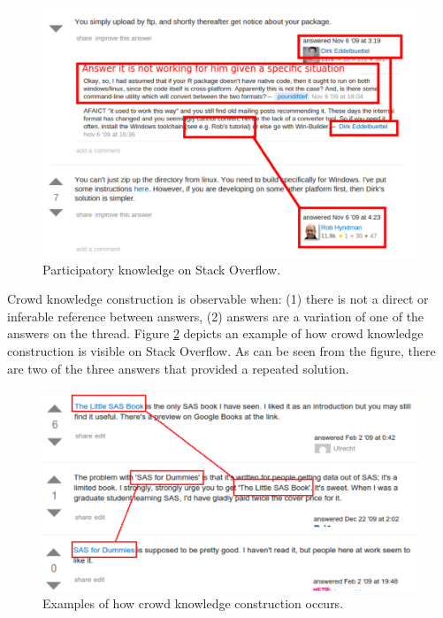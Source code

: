 \documentclass{sig-alternate-05-2015}
\begin{document}
	\begin{figure}[!htb]
		\centering
		\includegraphics[width=\columnwidth]{Figures/SO-PKimg5}
		\caption{Participatory knowledge on Stack Overflow.}
		\label{fig:SO-PK1}
	\end{figure}

	Crowd knowledge construction is observable when:
	(1) there is not a direct or inferable reference between answers, 
	(2) answers are a variation of one of the answers on the thread.
	Figure \ref{fig:CKC_MLSO} depicts an example of how crowd knowledge construction is visible on Stack Overflow.
	As can be seen from the figure, there are two of the three answers that provided a repeated solution.


	\begin{figure} [!htb]
		\centering
		\includegraphics[width=0.9\columnwidth]{Figures/SO-CSimg2}
		\caption{Examples of how crowd knowledge construction occurs.}
		\label{fig:CKC_MLSO}
	\end{figure}

\end{document}
